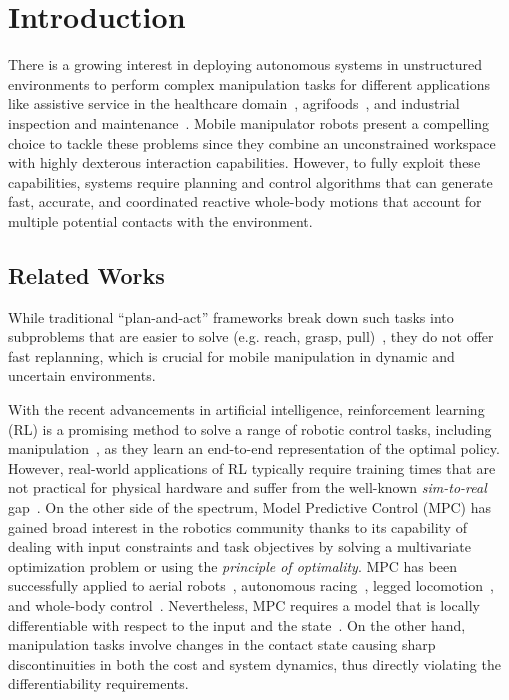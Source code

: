 \section{Introduction} \label{sec:introduction}

There is a growing interest in deploying autonomous systems in unstructured environments to perform complex manipulation tasks for different applications like assistive service in the healthcare domain~\cite{cooper2020ari}, agrifoods~\cite{duckett2018agricultural}, and industrial inspection and maintenance~\cite{lattanzi2017review}. Mobile manipulator robots present a compelling choice to tackle these problems since they combine an unconstrained workspace with highly dexterous interaction capabilities. However, to fully exploit these capabilities, systems require planning and control algorithms that can generate fast, accurate, and coordinated reactive whole-body motions that account for multiple potential contacts with the environment. 

\subsection{Related Works}

While traditional ``plan-and-act'' frameworks break down such tasks into subproblems that are easier to solve (e.g. reach, grasp, pull)~\cite{Murali2020}, they do not offer fast replanning, which is crucial for mobile manipulation in dynamic and uncertain environments.

With the recent advancements in artificial intelligence, reinforcement learning (RL) is a promising method to solve a range of robotic control tasks, including manipulation~\cite{finn2016deep}, as they learn an end-to-end representation of the optimal policy. However, real-world applications of RL typically require training times that are not practical for physical hardware and suffer from the well-known \textit{sim-to-real} gap~\cite{chebotar2019closing}. 
On the other side of the spectrum, Model Predictive Control (MPC) has gained broad interest in the robotics community thanks to its capability of dealing with input constraints and task objectives by solving a multivariate optimization problem or using the \textit{principle of optimality}. 
MPC has been successfully applied to aerial robots~\cite{brunner2020trajectory}, autonomous racing~\cite{liniger2015optimization}, legged locomotion~\cite{grandia2019frequency}, and whole-body control~\cite{minniti2019whole}. 
Nevertheless, MPC requires a model that is locally differentiable with respect to the input and the state~\cite{buchli2017optimal}. On the other hand, manipulation tasks involve changes in the contact state causing sharp discontinuities in both the cost and system dynamics, thus directly violating the differentiability requirements. 


